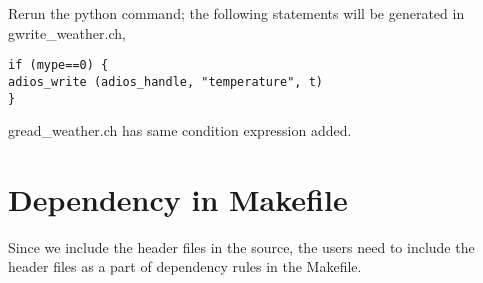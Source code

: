 Rerun the python command; the following statements will be generated in
gwrite\_weather.ch,

\begin{lstlisting}
if (mype==0) {
adios_write (adios_handle, "temperature", t)
}
\end{lstlisting}

gread\_weather.ch has same condition expression added.

\section*{Dependency in Makefile}

Since we include the header files in the source, the users need to include the 
header files as a part of dependency rules in the Makefile.
